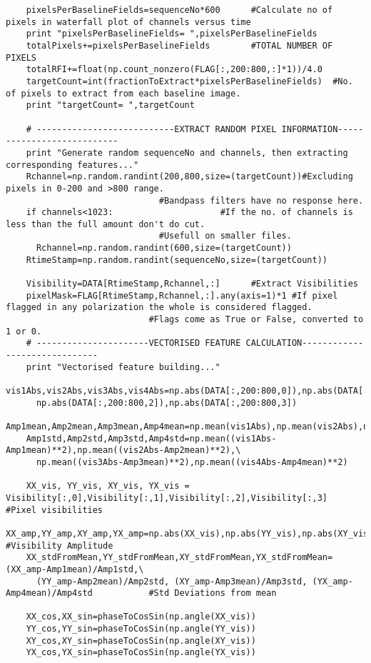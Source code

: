 \begin{verbatim}
    pixelsPerBaselineFields=sequenceNo*600		#Calculate no of pixels in waterfall plot of channels versus time
    print "pixelsPerBaselineFields= ",pixelsPerBaselineFields
    totalPixels+=pixelsPerBaselineFields		#TOTAL NUMBER OF PIXELS
    totalRFI+=float(np.count_nonzero(FLAG[:,200:800,:]*1))/4.0
    targetCount=int(fractionToExtract*pixelsPerBaselineFields)	#No. of pixels to extract from each baseline image.
    print "targetCount= ",targetCount

    # ---------------------------EXTRACT RANDOM PIXEL INFORMATION---------------------------
    print "Generate random sequenceNo and channels, then extracting corresponding features..."
    Rchannel=np.random.randint(200,800,size=(targetCount))#Excluding pixels in 0-200 and >800 range. 
							  #Bandpass filters have no response here.
    if channels<1023:					  #If the no. of channels is less than the full amount don't do cut.
							  #Usefull on smaller files.
      Rchannel=np.random.randint(600,size=(targetCount))
    RtimeStamp=np.random.randint(sequenceNo,size=(targetCount))
    
    Visibility=DATA[RtimeStamp,Rchannel,:]		#Extract Visibilities
    pixelMask=FLAG[RtimeStamp,Rchannel,:].any(axis=1)*1	#If pixel flagged in any polarization the whole is considered flagged.
							#Flags come as True or False, converted to 1 or 0.
    # ----------------------VECTORISED FEATURE CALCULATION------------------------------
    print "Vectorised feature building..."
    vis1Abs,vis2Abs,vis3Abs,vis4Abs=np.abs(DATA[:,200:800,0]),np.abs(DATA[:,200:800,1]),\
      np.abs(DATA[:,200:800,2]),np.abs(DATA[:,200:800,3])
    Amp1mean,Amp2mean,Amp3mean,Amp4mean=np.mean(vis1Abs),np.mean(vis2Abs),np.mean(vis3Abs),np.mean(vis4Abs)
    Amp1std,Amp2std,Amp3std,Amp4std=np.mean((vis1Abs-Amp1mean)**2),np.mean((vis2Abs-Amp2mean)**2),\
      np.mean((vis3Abs-Amp3mean)**2),np.mean((vis4Abs-Amp4mean)**2)    
    
    XX_vis, YY_vis, XY_vis, YX_vis = Visibility[:,0],Visibility[:,1],Visibility[:,2],Visibility[:,3]	#Pixel visibilities
    XX_amp,YY_amp,XY_amp,YX_amp=np.abs(XX_vis),np.abs(YY_vis),np.abs(XY_vis),np.abs(YX_vis)		#Visibility Amplitude
    XX_stdFromMean,YY_stdFromMean,XY_stdFromMean,YX_stdFromMean=(XX_amp-Amp1mean)/Amp1std,\
      (YY_amp-Amp2mean)/Amp2std, (XY_amp-Amp3mean)/Amp3std, (YX_amp-Amp4mean)/Amp4std			#Std Deviations from mean
    
    XX_cos,XX_sin=phaseToCosSin(np.angle(XX_vis))
    YY_cos,YY_sin=phaseToCosSin(np.angle(YY_vis))
    XY_cos,XY_sin=phaseToCosSin(np.angle(XY_vis))
    YX_cos,YX_sin=phaseToCosSin(np.angle(YX_vis))


\end{verbatim}
